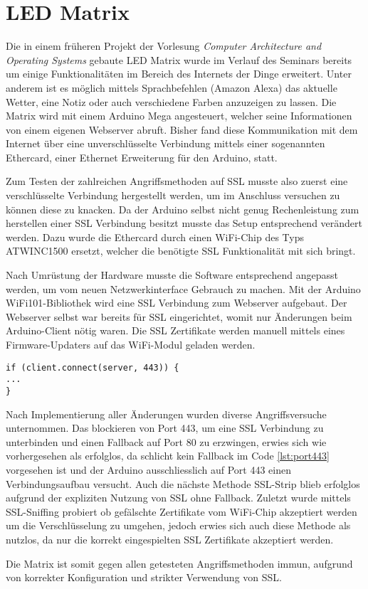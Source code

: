 \documentclass[11pt,a4paper]{scrartcl}
\begin{document}
\section{LED Matrix}
Die in einem früheren Projekt der Vorlesung \textit{Computer Architecture and Operating Systems} gebaute LED Matrix wurde im Verlauf des Seminars bereits um einige Funktionalitäten im Bereich des Internets der Dinge erweitert. Unter anderem ist es möglich mittels Sprachbefehlen (Amazon Alexa) das aktuelle Wetter, eine Notiz oder auch verschiedene Farben anzuzeigen zu lassen. Die Matrix wird mit einem Arduino Mega angesteuert, welcher seine Informationen von einem eigenen Webserver abruft. Bisher fand diese Kommunikation mit dem Internet über eine unverschlüsselte Verbindung mittels einer sogenannten Ethercard, einer Ethernet Erweiterung für den Arduino, statt.

Zum Testen der zahlreichen Angriffsmethoden auf SSL musste also zuerst eine verschlüsselte Verbindung hergestellt werden, um im Anschluss versuchen zu können diese zu knacken. Da der Arduino selbst nicht genug Rechenleistung zum herstellen einer SSL Verbindung besitzt musste das Setup entsprechend verändert werden. Dazu wurde die Ethercard durch einen WiFi-Chip des Typs ATWINC1500 ersetzt, welcher die benötigte SSL Funktionalität mit sich bringt. 

Nach Umrüstung der Hardware musste die Software entsprechend angepasst werden, um vom neuen Netzwerkinterface Gebrauch zu machen. Mit der Arduino WiFi101-Bibliothek \cite{arduino:WiFi} wird eine SSL Verbindung zum Webserver aufgebaut. Der Webserver selbst war bereits für SSL eingerichtet, womit nur Änderungen beim Arduino-Client nötig waren. Die SSL Zertifikate werden manuell mittels eines Firmware-Updaters auf das WiFi-Modul geladen werden.
\begin{lstlisting}[label={lst:port443},caption={Port 443 ohne Fallback auf Port 80}]
if (client.connect(server, 443)) {
...
}
\end{lstlisting}
Nach Implementierung aller Änderungen wurden diverse Angriffsversuche unternommen. Das blockieren von Port 443, um eine SSL Verbindung zu unterbinden und einen Fallback auf Port 80 zu erzwingen, erwies sich wie vorhergesehen als erfolglos, da schlicht kein Fallback im Code \ref{lst:port443} vorgesehen ist und der Arduino ausschliesslich auf Port 443 einen Verbindungsaufbau versucht.
Auch die nächste Methode SSL-Strip blieb erfolglos aufgrund der expliziten Nutzung von SSL ohne Fallback.
Zuletzt wurde mittels SSL-Sniffing probiert ob gefälschte Zertifikate vom WiFi-Chip akzeptiert werden um die Verschlüsselung zu umgehen, jedoch erwies sich auch diese Methode als nutzlos, da nur die korrekt eingespielten SSL Zertifikate akzeptiert werden. 

Die Matrix ist somit gegen allen getesteten Angriffsmethoden immun, aufgrund von korrekter Konfiguration und strikter Verwendung von SSL. 
\end{document}
